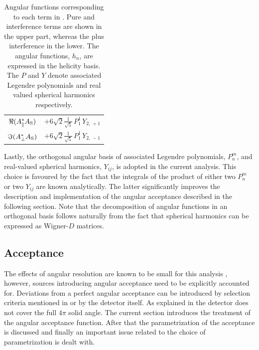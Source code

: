 \begin{table}[t]
\begin{tabular}{cc}
    $\Re({A}_{\parallel}^* {A}_{{\text{S}}})$  &
      $+6\sqrt{2}\tfrac{1}{\sqrt{5}}\, P_1^1\, Y_{2,\,+1}$  \\ %

    $\Im({A}_{\perp}^* {A}_{{\text{S}}})$  &
      $+6\sqrt{2}\tfrac{1}{\sqrt{5}}\, P_1^1\, Y_{2,\,-1}$  \\ %
    \hline
  \end{tabular}
  \caption{Angular functions corresponding to each term in . Pure and interference \pwave terms are shown in the upper part,
    whereas the \swave plus \spwave interference in the lower. The angular functions, $h_n$, are expressed in the helicity basis.
    The $P$ and $Y$ denote associated Legendre polynomials and real valued spherical harmonics respectively.}
  \label{ang_distr}
\end{table}

Lastly, the orthogonal angular basis of associated Legendre polynomials, $P_n^m$, and real-valued
spherical harmonics, $Y_{ij}$, is adopted in the current analysis. This choice is favoured by the
fact that the integrals of the product of either two $P_n^m$ or two $Y_{ij}$ are known analytically.
The latter significantly improves the description and implementation of the angular acceptance described in the following section.
Note that the decomposition of angular functions in an orthogonal basis follows naturally from the fact that spherical
harmonics can be expressed as Wigner-$D$ matrices.

\subsection{Acceptance}
\label{Accceptance}

The effects of angular resolution are known to be small for this analysis \cite{tristanThesis},
however, sources introducing angular acceptance need to be explicitly accounted for.
Deviations from a perfect angular acceptance can be introduced by selection criteria mentioned in  or by the detector itself.
As explained in  the \lhcb detector does not cover the full $4\pi$ solid angle.
The current section introduces the treatment of the angular acceptance function. After that the parametrization
of the acceptance is discussed and finally an important issue related to the choice of parametrization is dealt with.

